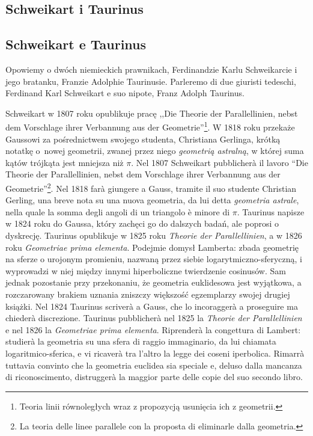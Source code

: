 %

\subsection{Schweikart i Taurinus} %
\subsection{Schweikart e Taurinus} %
\label{sekcja_schweikart_taurinus}

Opowiemy o dwóch niemieckich prawnikach, Ferdinandzie Karlu Schweikarcie i jego bratanku, Franzie Adolphie Taurinusie. %
Parleremo di due giuristi tedeschi, Ferdinand Karl Schweikart e suo nipote, Franz Adolph Taurinus. %

Schweikart w 1807 roku opublikuje pracę ,,Die Theorie der Parallellinien, nebst dem Vorschlage ihrer Verbannung aus der Geometrie''\footnote{Teoria linii równoległych wraz z propozycją usunięcia ich z geometrii.}. %
W 1818 roku przekaże Gaussowi za pośrednictwem swojego studenta, Christiana Gerlinga, krótką notatkę o~nowej geometrii, zwanej przez niego \emph{geometrią astralną}, w której suma kątów trójkąta jest mniejsza niż $\pi$. %
Nel 1807 Schweikart pubblicherà il lavoro ``Die Theorie der Parallellinien, nebst dem Vorschlage ihrer Verbannung aus der Geometrie''\footnote{La teoria delle linee parallele con la proposta di eliminarle dalla geometria.}. %
Nel 1818 farà giungere a Gauss, tramite il suo studente Christian Gerling, una breve nota su una nuova geometria, da lui detta \emph{geometria astrale}, nella quale la somma degli angoli di un triangolo è minore di $\pi$. %
%
%
Taurinus napisze w 1824 roku do Gaussa, który zachęci go do dalszych badań, ale poprosi o dyskrecję. %
Taurinus opublikuje w 1825 roku \emph{Theorie der Parallellinien}, a w 1826 roku \emph{Geometriae prima elementa}. %
Podejmie domysł Lamberta: zbada geometrię na sferze o urojonym promieniu, nazwaną przez siebie logarytmiczno-sferyczną, i wyprowadzi w niej między innymi hiperboliczne twierdzenie cosinusów. %
Sam jednak pozostanie przy przekonaniu, że geometria euklidesowa jest wyjątkowa, a rozczarowany brakiem uznania zniszczy większość egzemplarzy swojej drugiej książki. %
Nel 1824 Taurinus scriverà a Gauss, che lo incoraggerà a proseguire ma chiederà discrezione. %
Taurinus pubblicherà nel 1825 la \emph{Theorie der Parallellinien} e nel 1826 la \emph{Geometriae prima elementa}. %
Riprenderà la congettura di Lambert: studierà la geometria su una sfera di raggio immaginario, da lui chiamata logaritmico-sferica, e vi ricaverà tra l'altro la legge dei coseni iperbolica. %
Rimarrà tuttavia convinto che la geometria euclidea sia speciale e, deluso dalla mancanza di riconoscimento, distruggerà la maggior parte delle copie del suo secondo libro. %
%

